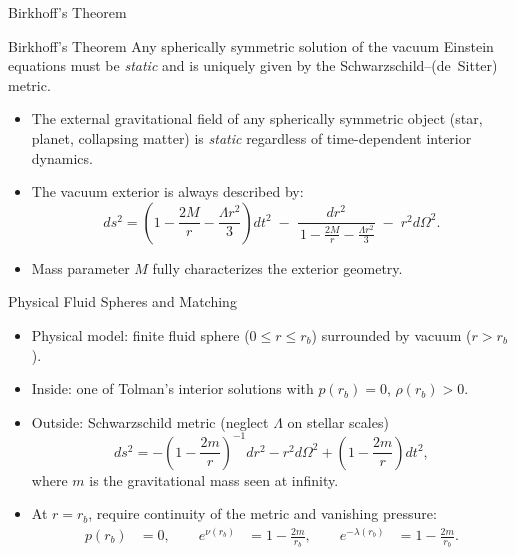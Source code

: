 \documentclass[11pt]{beamer}
\begin{document}
\begin{frame}{Birkhoff's Theorem}

\begin{block}{Birkhoff's Theorem}
Any spherically symmetric solution of the vacuum Einstein equations must be \emph{static} and
is uniquely given by the Schwarzschild--(de~Sitter) metric.
\end{block}

\medskip

\begin{itemize}
    \item The external gravitational field of any spherically symmetric
          object (star, planet, collapsing matter) is \emph{static}
          regardless of time-dependent interior dynamics.
    \item The vacuum exterior is always described by:
    \[
    ds^2 = 
    \left(1 - \frac{2M}{r} - \frac{\Lambda r^2}{3}\right) dt^2
    \;-\;
    \frac{dr^2}{\,1 - \frac{2M}{r} - \frac{\Lambda r^2}{3}}
    \;-\; r^2 d\Omega^2 .
    \]
    \item Mass parameter \(M\) fully characterizes the exterior geometry.
\end{itemize}
\end{frame}


\begin{frame}{Physical Fluid Spheres and Matching}
  \begin{itemize}
    \item Physical model: finite fluid sphere ($0 \le r \le r_b$) surrounded by vacuum ($r > r_b$).
    \item Inside: one of Tolman’s interior solutions with $p(r_b)=0$, $\rho(r_b) > 0$.
    \item Outside: Schwarzschild metric (neglect $\Lambda$ on stellar scales)
      \[
        ds^2 = -\left(1-\frac{2m}{r}\right)^{-1} dr^2 - r^2 d\Omega^2
        + \left(1-\frac{2m}{r}\right)dt^2,
      \]
      where $m$ is the gravitational mass seen at infinity.
    \item At $r=r_b$, require continuity of the metric and vanishing pressure:
    \[
    \begin{alignedat}{2}
    p(r_b) &= 0, \qquad
    e^{\nu(r_b)} &= 1 - \frac{2m}{r_b}, \qquad
    e^{-\lambda(r_b)} &= 1 - \frac{2m}{r_b}.
    \end{alignedat}
    \]
  \end{itemize}
\end{frame}
\end{document}
